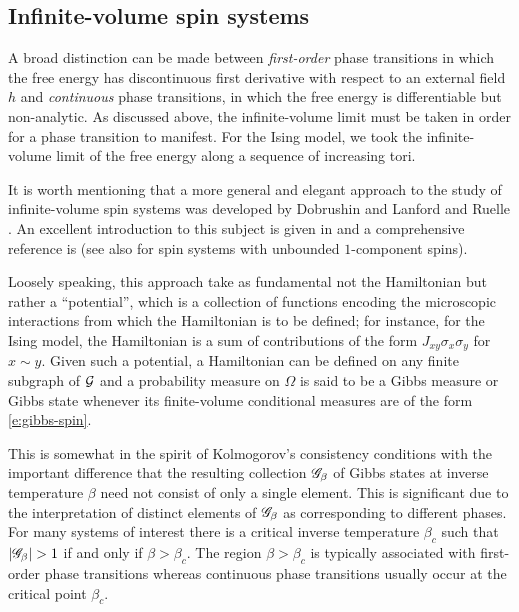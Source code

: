 
\subsection{Infinite-volume spin systems}

A broad distinction can be made between \emph{first-order} phase transitions
in which the free energy has discontinuous first derivative with respect to an
external field $h$ and \emph{continuous} phase transitions, in which the free
energy is differentiable but non-analytic. As discussed above, the infinite-volume
limit must be taken in order for a phase transition to manifest. For the Ising
model, we took the infinite-volume limit of the free energy along a sequence of
increasing tori.

It is worth mentioning that a more general and elegant approach to the study
of infinite-volume spin systems was developed by Dobrushin \cite{Dobrushin68}
and Lanford and Ruelle \cite{LR69}. An excellent introduction to this subject is
given in \cite{FV17} and a comprehensive reference is \cite{Georgii11}
(see also \cite{LP76} for spin systems with unbounded $1$-component spins).

Loosely speaking, this approach take as fundamental not the Hamiltonian
but rather a ``potential'', which is a collection of functions encoding the
microscopic interactions from which the Hamiltonian is to be defined; for
instance, for the Ising model, the Hamiltonian is a sum of contributions of the
form $J_{xy} \sigma_x \sigma_y$ for $x \sim y$. Given such a potential, a
Hamiltonian can be defined on any finite subgraph of $\mathcal{G}$ and a probability
measure on $\Omega$ is said to be a Gibbs measure or Gibbs state whenever its
finite-volume conditional measures are of the form \eqref{e:gibbs-spin}.

This is somewhat in the spirit of Kolmogorov's consistency conditions with the important
difference that the resulting collection $\mathscr{G}_\beta$ of Gibbs states at inverse
temperature $\beta$ need not consist of only a single element. This is significant
due to the interpretation of distinct elements of $\mathscr{G}_\beta$ as corresponding
to different phases.
For many systems of interest there is a critical inverse temperature $\beta_c$
such that $|\mathscr{G}_\beta| > 1$ if and only if $\beta > \beta_c$. The region
$\beta > \beta_c$ is typically associated with first-order phase transitions
whereas continuous phase transitions usually occur at the critical point $\beta_c$.

